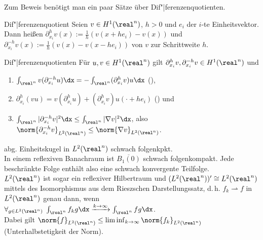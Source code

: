 \linie

\begin{Bem}
    Zum Beweis benötigt man ein paar Sätze über Dif"|ferenzenquotienten.
\end{Bem}

\begin{Def}{Dif"|ferenzenquotient}
    Seien $v \in H^1(\real^n)$, $h > 0$ und $e_i$ der $i$-te Einheitsvektor.\\
    Dann heißen
    $\partial_{x_i}^h v(x) := \frac{1}{h} (v(x + he_i) - v(x))$ und
    $\partial_{x_i}^{-h} v(x) := \frac{1}{h} (v(x) - v(x - he_i))$
     von $v$ zur Schrittweite $h$.
\end{Def}

\begin{Lemma}{Dif"|ferenzenquotienten}
    Für $u, v \in H^1(\real^n)$ gilt
    $\partial_{x_i}^h v, \partial_{x_i}^{-h} v \in H^1(\real^n)$ und
    \begin{enumerate}
        \item
        $\int_{\real^n} v (\partial_{x_i}^{-h} u)\dx = -\int_{\real^n} (\partial_{x_i}^h v) u \dx$
        (),

        \item
        $\partial_{x_i}^h (vu)
        = v (\partial_{x_i}^h u) + (\partial_{x_i}^h v) u(\cdot + he_i)$
        () und

        \item
        $\int_{\real^n} |\partial_{x_i}^{-h} v|^2 \dx \le \int_{\real^n} |\nabla v|^2 \dx$,
        also $\norm{\partial_{x_i}^{-h} v}_{L^2(\real^n)} \le \norm{\nabla v}_{L^2(\real^n)}$.
    \end{enumerate}
\end{Lemma}

\begin{Lemma}{abg. Einheitskugel in $L^2(\real^n)$ schwach folgenkpkt.}\\
    In einem reflexiven Banachraum ist $\overline{B_1(0)}$ schwach folgenkompakt.
    Jede beschränkte Folge enthält also eine schwach konvergente Teilfolge.\\
    $L^2(\real^n)$ ist sogar ein reflexiver Hilbertraum und $(L^2(\real^n))' \cong L^2(\real^n)$
    mittels des Isomorphismus aus dem Rieszschen Darstellungssatz, d.\,h.
    $f_k \rightharpoonup f$ in $L^2(\real^n)$ genau dann, wenn\\
    $\forall_{g \in L^2(\real^n)}\; \int_{\real^n} f_k g\dx \xrightarrow{k \to \infty}
    \int_{\real^n} fg\dx$.\\
    Dabei gilt $\norm{f}_{L^2(\real^n)} \le \liminf_{k \to \infty} \norm{f_k}_{L^2(\real^n)}$
    (Unterhalbstetigkeit der Norm).
\end{Lemma}

